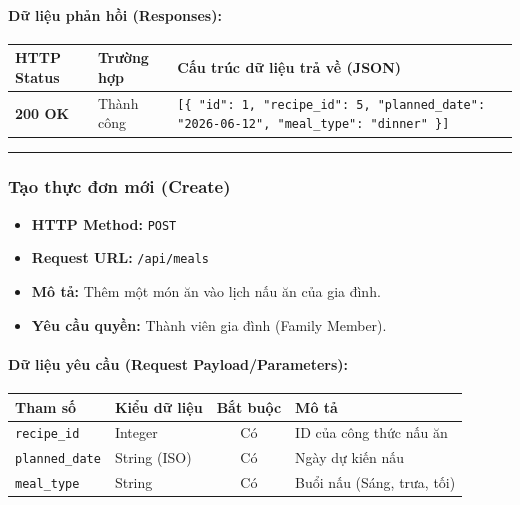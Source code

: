 \documentclass[12pt,a4paper]{article}
\begin{document}
\paragraph{Dữ liệu phản hồi (Responses):}
\begin{longtable}{|>{\raggedright\arraybackslash}p{2.8cm}|>{\raggedright\arraybackslash}p{3.2cm}|>{\raggedright\arraybackslash}p{8.0cm}|}
\hline
\textbf{HTTP Status} & \textbf{Trường hợp} & \textbf{Cấu trúc dữ liệu trả về (JSON)} \\ \hline
\endhead
\textbf{200 OK} & Thành công & \texttt{[\{ "id": 1, "recipe\_id": 5, "planned\_date": "2026-06-12", "meal\_type": "dinner" \}]} \\ \hline
\end{longtable}

\vskip 0.4cm
\noindent\rule{\textwidth}{0.3pt}
\vskip 0.4cm

\subsubsection{Tạo thực đơn mới (Create)}
\begin{itemize}[leftmargin=*]
    \item \textbf{HTTP Method:} \texttt{POST}
    \item \textbf{Request URL:} \texttt{/api/meals}
    \item \textbf{Mô tả:} Thêm một món ăn vào lịch nấu ăn của gia đình.
    \item \textbf{Yêu cầu quyền:} Thành viên gia đình (Family Member).
\end{itemize}

\paragraph{Dữ liệu yêu cầu (Request Payload/Parameters):}
\begin{longtable}{|>{\raggedright\arraybackslash}p{2.8cm}|>{\raggedright\arraybackslash}p{2.2cm}|c|>{\raggedright\arraybackslash}p{7.0cm}|}
\hline
\textbf{Tham số} & \textbf{Kiểu dữ liệu} & \textbf{Bắt buộc} & \textbf{Mô tả} \\ \hline
\endhead
\texttt{recipe\_id} & Integer & Có & ID của công thức nấu ăn \\ \hline
\texttt{planned\_date} & String (ISO) & Có & Ngày dự kiến nấu \\ \hline
\texttt{meal\_type} & String & Có & Buổi nấu (Sáng, trưa, tối) \\ \hline
\end{longtable}
\end{document}
